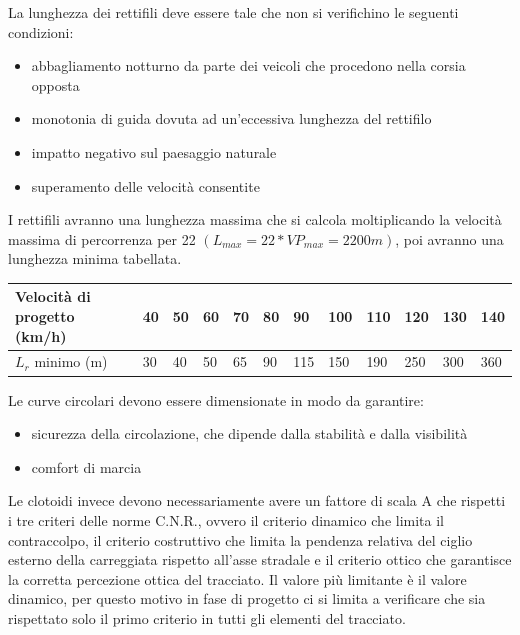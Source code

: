 La lunghezza dei rettifili deve essere tale che non si verifichino le seguenti condizioni:

\begin{itemize}
    \item[\bullet] abbagliamento notturno da parte dei veicoli che procedono nella corsia opposta
    \item[\bullet] monotonia di guida dovuta ad un’eccessiva lunghezza del rettifilo
    \item[\bullet] impatto negativo sul paesaggio naturale
    \item[\bullet] superamento delle velocità consentite
\end{itemize}

I rettifili avranno una lunghezza massima che si calcola moltiplicando la velocità massima di percorrenza per 22 $(L_{max}=22*VP_{max}= 2200m)$, poi avranno una lunghezza minima tabellata.

    \begin{table}[H]
        \begin{center}
        \begin{tabular}{@{}llllllllllll@{}}
        \toprule
         Velocità di progetto (km/h)& 40 & 50 & 60 & 70 & 80 & 90 & 100 & 110 & 120 & 130 & 140 \\ \midrule
         $L_r$ minimo (m)& 30 & 40 & 50 & 65 & 90 & 115 & 150 & 190 & 250 & 300 & 360 \\ \bottomrule
        \end{tabular}
    \end{center}
        \end{table}

Le curve circolari devono essere dimensionate in modo da garantire:

\begin{itemize}
    \item[\bullet] sicurezza della circolazione, che dipende dalla stabilità e dalla visibilità
    \item[\bullet] comfort di marcia
\end{itemize}

Le clotoidi invece devono necessariamente avere un fattore di scala A che rispetti i tre criteri delle norme C.N.R., ovvero il criterio dinamico che limita il contraccolpo, il criterio costruttivo che limita la pendenza relativa del ciglio esterno della carreggiata rispetto all'asse stradale e il criterio ottico che garantisce la corretta percezione ottica del tracciato. Il valore più limitante è il valore dinamico, per questo motivo in fase di progetto ci si limita a verificare che sia rispettato solo il primo criterio in tutti gli elementi del tracciato.

